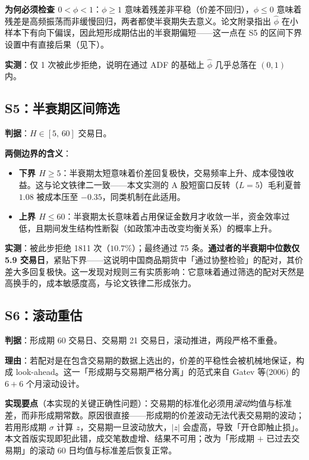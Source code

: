 \textbf{为何必须检查 $0<\phi<1$}：$\phi\ge1$ 意味着残差非平稳（价差不回归），$\phi\le0$ 意味着残差是高频振荡而非缓慢回归，两者都使半衰期失去意义。论文附录指出 $\hat\phi$ 在小样本下有向下偏误，因此短形成期估出的半衰期偏短——这一点在 S5 的区间下界设置中有直接后果（见下）。

\textbf{实测}：仅 1 次被此步拒绝，说明在通过 ADF 的基础上 $\hat\phi$ 几乎总落在 $(0,1)$ 内。

\subsection{S5：半衰期区间筛选}

\textbf{判据}：$H\in[5,\,60]$ 交易日。

\textbf{两侧边界的含义}：
\begin{itemize}[leftmargin=2.2em]
  \item \textbf{下界 $H\ge5$}：半衰期太短意味着价差回复极快，交易频率上升、成本侵蚀收益。这与论文铁律二一致——本文实测的 A 股短窗口反转（$L=5$）毛利夏普 $1.08$ 被成本压至 $-0.35$，同类机制在此适用。
  \item \textbf{上界 $H\le60$}：半衰期太长意味着占用保证金数月才收敛一半，资金效率过低，且期间发生结构性断裂（如政策冲击改变均衡关系）的概率上升。
\end{itemize}

\textbf{实测}：被此步拒绝 1811 次（$10.7\%$）；最终通过 75 条。\textbf{通过者的半衰期中位数仅 5.9 交易日}，紧贴下界——这说明中国商品期货中「通过协整检验」的配对，其价差大多回复极快。这一发现对规则三有实质影响：它意味着通过筛选的配对天然是高换手的，成本敏感度高，与论文铁律二形成张力。

\subsection{S6：滚动重估}

\textbf{判据}：形成期 60 交易日、交易期 21 交易日，滚动推进，两段严格不重叠。

\textbf{理由}：若配对是在包含交易期的数据上选出的，价差的平稳性会被机械地保证，构成 look-ahead。这一「形成期与交易期严格分离」的范式来自 Gatev 等(2006) 的 $6+6$ 个月滚动设计\cite{gatev2006}。

\textbf{实现要点}（本实现的关键正确性问题）：交易期的标准化必须用\emph{滚动}均值与标准差，而非形成期常数。原因很直接——形成期的价差波动无法代表交易期的波动；若用形成期 $\sigma$ 计算 $z$，交易期一旦波动放大，$|z|$ 会虚高，导致「开仓即触止损」。本文首版实现即犯此错，成交笔数虚增、结果不可用；改为「形成期 $+$ 已过去交易期」的滚动 60 日均值与标准差后恢复正常。

